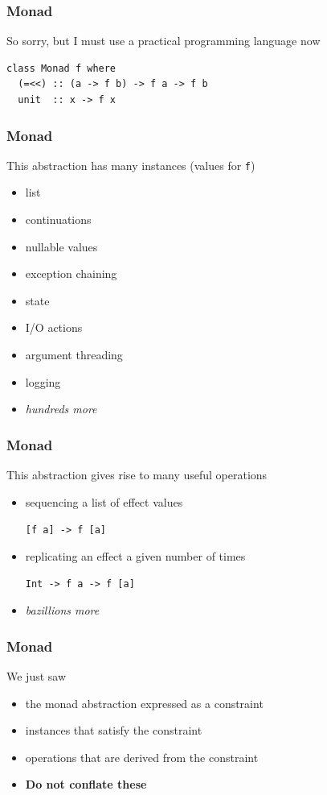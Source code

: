 \begin{frame}[fragile]
\frametitle{Monad}
\begin{block}{So sorry, but I must use a practical programming language now}
\begin{lstlisting}[style=haskell,mathescape]
class Monad f where
  (=<<) :: (a -> f b) -> f a -> f b
  unit  :: x -> f x
\end{lstlisting}
\end{block}
\end{frame}


\begin{frame}[fragile]
\frametitle{Monad}
\begin{block}{This abstraction has many instances (values for \lstinline$f$)}
\begin{itemize}
  \item list
  \item continuations
  \item nullable values
  \item exception chaining
  \item state
  \item I/O actions
  \item argument threading
  \item logging
  \item \emph{hundreds more}
\end{itemize}
\end{block}
\end{frame}


\begin{frame}
\frametitle{Monad}
\begin{block}{This abstraction gives rise to many useful operations}
\begin{itemize}
  \item sequencing a list of effect values

        \lstinline$[f a] -> f [a]$
  \item replicating an effect a given number of times

        \lstinline$Int -> f a -> f [a]$
  \item \emph{bazillions more}
\end{itemize}
\end{block}
\end{frame}


\begin{frame}
\frametitle{Monad}
\begin{block}{We just saw}
\begin{itemize}
  \item<1> the monad abstraction expressed as a constraint
  \item<2> instances that satisfy the constraint
  \item<3> operations that are derived from the constraint
  \item<4> \textbf{Do not conflate these}
\end{itemize}
\end{block}
\end{frame}



